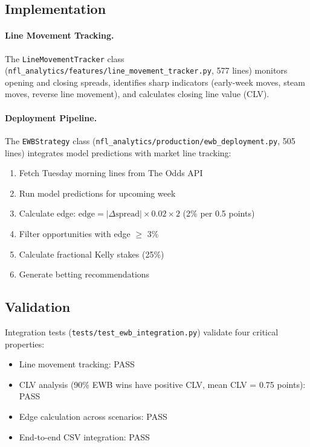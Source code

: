 \subsection{Implementation}

\paragraph{Line Movement Tracking.}
The \texttt{LineMovementTracker} class (\texttt{nfl\_analytics/features/line\_movement\_tracker.py}, 577 lines) monitors opening and closing spreads, identifies sharp indicators (early-week moves, steam moves, reverse line movement), and calculates closing line value (CLV).

\paragraph{Deployment Pipeline.}
The \texttt{EWBStrategy} class (\texttt{nfl\_analytics/production/ewb\_deployment.py}, 505 lines) integrates model predictions with market line tracking:
\begin{enumerate}
  \item Fetch Tuesday morning lines from The Odds API
  \item Run model predictions for upcoming week
  \item Calculate edge: $\text{edge} = |\Delta\text{spread}| \times 0.02 \times 2$ (2\% per 0.5 points)
  \item Filter opportunities with edge $\geq$ 3\%
  \item Calculate fractional Kelly stakes (25\%)
  \item Generate betting recommendations
\end{enumerate}

\subsection{Validation}

Integration tests (\texttt{tests/test\_ewb\_integration.py}) validate four critical properties:
\begin{itemize}
  \item Line movement tracking: PASS
  \item CLV analysis (90\% EWB wins have positive CLV, mean CLV = 0.75 points): PASS
  \item Edge calculation across scenarios: PASS
  \item End-to-end CSV integration: PASS
\end{itemize}

